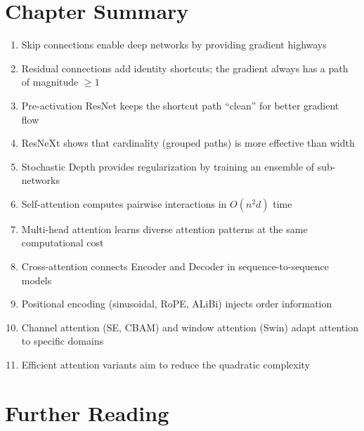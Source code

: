 \section{Chapter Summary}

\begin{enumerate}
    \item Skip connections enable deep networks by providing gradient highways
    \item Residual connections add identity shortcuts; the gradient always has a path of magnitude $\geq 1$
    \item Pre-activation ResNet keeps the shortcut path ``clean'' for better gradient flow
    \item ResNeXt shows that cardinality (grouped paths) is more effective than width
    \item Stochastic Depth provides regularization by training an ensemble of sub-networks
    \item Self-attention computes pairwise interactions in $O(n^2 d)$ time
    \item Multi-head attention learns diverse attention patterns at the same computational cost
    \item Cross-attention connects Encoder and Decoder in sequence-to-sequence models
    \item Positional encoding (sinusoidal, RoPE, ALiBi) injects order information
    \item Channel attention (SE, CBAM) and window attention (Swin) adapt attention to specific domains
    \item Efficient attention variants aim to reduce the quadratic complexity
\end{enumerate}

\section{Further Reading}

